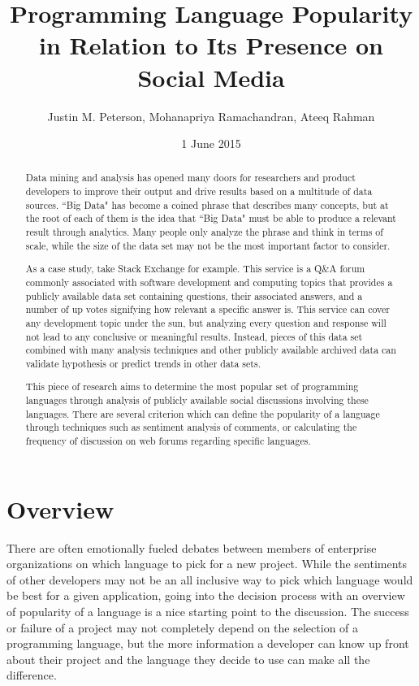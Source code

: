 \documentclass{sig-alternate}
\begin{document}
\title{Programming Language Popularity in Relation to Its Presence on Social Media}
\author{
\alignauthor
Justin M. Peterson,
Mohanapriya Ramachandran,
Ateeq Rahman
}
\date{1 June 2015}
\maketitle
\begin{abstract}

Data mining and analysis has opened many doors for researchers and product developers to improve their output and drive results based on a multitude of data sources. ``Big Data" has become a coined phrase that describes many concepts, but at the root of each of them is the idea that ``Big Data" must be able to produce a relevant result through analytics. Many people only analyze the phrase and think in terms of scale, while the size of the data set may not be the most important factor to consider. 

As a case study, take Stack Exchange \cite{iEEE:6542441} for example. This service is a Q\&A forum commonly associated with software development and computing topics that provides a publicly available data set containing questions, their associated answers, and a number of up votes signifying how relevant a specific answer is. This service can cover any development topic under the sun, but analyzing every question and response will not lead to any conclusive or meaningful results. Instead, pieces of this data set combined with many analysis techniques and other publicly available archived data can validate hypothesis or predict trends in other data sets. 

This piece of research aims to determine the most popular set of programming languages through analysis of publicly available social discussions involving these languages. There are several criterion which can define the popularity of a language through techniques such as sentiment analysis of comments, or calculating the frequency of discussion on web forums regarding specific languages. 

\end{abstract}

\section{Overview}
\label{overview}
There are often emotionally fueled debates between members of enterprise organizations on which language to pick for a new project. While the sentiments of other developers may not be an all inclusive way to pick which language would be best for a given application, going into the decision process with an overview of popularity of a language is a nice starting point to the discussion. The success or failure of a project may not completely depend on the selection of a programming language, but the more information a developer can know up front about their project and the language they decide to use can make all the difference.
\end{document}
